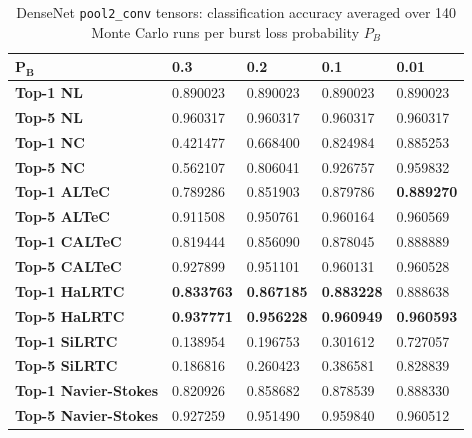 \documentclass[conference,letterpaper]{IEEEtran}
\begin{document}
\begin{table}[t]
\caption{DenseNet \texttt{pool2\_conv} tensors: classification accuracy averaged over 140 Monte Carlo runs per burst loss probability $P_B$}
\label{table:densenet121pool2conv}
\begin{tabular}{|l|llll|}
\hline
$\mathbf{P_B}$   & \textbf{0.3} & \textbf{0.2} & \textbf{0.1}   & \textbf{0.01}     \\
\hline
\textbf{Top-1 NL}        & 0.890023 & 0.890023 & 0.890023 & 0.890023 \\
\textbf{Top-5 NL}        & 0.960317 & 0.960317 & 0.960317 & 0.960317 \\
\hline
\textbf{Top-1 NC}            & 0.421477 & 0.668400 & 0.824984 & 0.885253 \\
\textbf{Top-5 NC}            & 0.562107 & 0.806041 & 0.926757 & 0.959832 \\
\hline
\textbf{Top-1 ALTeC}         & 0.789286 & 0.851903 & 0.879786 & \textbf{0.889270} \\
\textbf{Top-5 ALTeC}         & 0.911508 & 0.950761 & 0.960164 & 0.960569 \\
\hline
\textbf{Top-1 CALTeC}        & 0.819444 & 0.856090 & 0.878045 & 0.888889 \\
\textbf{Top-5 CALTeC}        & 0.927899 & 0.951101 & 0.960131 & 0.960528 \\
\hline
\textbf{Top-1 HaLRTC}        & \textbf{0.833763} & \textbf{0.867185} & \textbf{0.883228} & 0.888638 \\
\textbf{Top-5 HaLRTC}        & \textbf{0.937771} & \textbf{0.956228} & \textbf{0.960949} & \textbf{0.960593} \\
\hline
\textbf{Top-1 SiLRTC}        & 0.138954 & 0.196753 & 0.301612 & 0.727057 \\
\textbf{Top-5 SiLRTC}        & 0.186816 & 0.260423 & 0.386581 & 0.828839 \\
\hline
\textbf{Top-1 Navier-Stokes} & 0.820926 & 0.858682 & 0.878539 & 0.888330 \\
\textbf{Top-5 Navier-Stokes} & 0.927259 & 0.951490 & 0.959840 & 0.960512 \\
\hline
\end{tabular}
\end{table}
\end{document}
